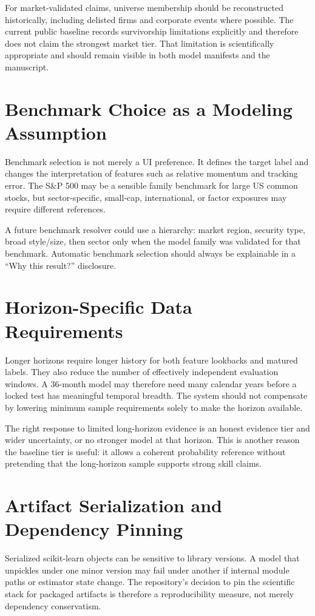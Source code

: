 \documentclass[11pt]{article}
\begin{document}
For market-validated claims, universe membership should be reconstructed historically, including delisted firms and corporate events where possible. The current public baseline records survivorship limitations explicitly and therefore does not claim the strongest market tier. That limitation is scientifically appropriate and should remain visible in both model manifests and the manuscript.

\section{Benchmark Choice as a Modeling Assumption}
Benchmark selection is not merely a UI preference. It defines the target label and changes the interpretation of features such as relative momentum and tracking error. The S\&P 500 may be a sensible family benchmark for large US common stocks, but sector-specific, small-cap, international, or factor exposures may require different references.

A future benchmark resolver could use a hierarchy: market region, security type, broad style/size, then sector only when the model family was validated for that benchmark. Automatic benchmark selection should always be explainable in a ``Why this result?'' disclosure.

\section{Horizon-Specific Data Requirements}
Longer horizons require longer history for both feature lookbacks and matured labels. They also reduce the number of effectively independent evaluation windows. A 36-month model may therefore need many calendar years before a locked test has meaningful temporal breadth. The system should not compensate by lowering minimum sample requirements solely to make the horizon available.

The right response to limited long-horizon evidence is an honest evidence tier and wider uncertainty, or no stronger model at that horizon. This is another reason the baseline tier is useful: it allows a coherent probability reference without pretending that the long-horizon sample supports strong skill claims.

\section{Artifact Serialization and Dependency Pinning}
Serialized scikit-learn objects can be sensitive to library versions. A model that unpickles under one minor version may fail under another if internal module paths or estimator state change. The repository's decision to pin the scientific stack for packaged artifacts is therefore a reproducibility measure, not merely dependency conservatism.
\end{document}
